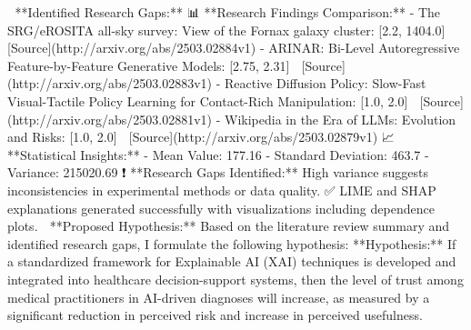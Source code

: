 \documentclass{article}%
\begin{document}
  \newline%
\newline%
🔹 **Identified Research Gaps:**  \newline%
📊 **Research Findings Comparison:**\newline%
{-} The SRG/eROSITA all{-}sky survey: View of the Fornax galaxy cluster: {[}2.2, 1404.0{]} 🔗 {[}Source{]}(http://arxiv.org/abs/2503.02884v1)\newline%
{-} ARINAR: Bi{-}Level Autoregressive Feature{-}by{-}Feature Generative Models: {[}2.75, 2.31{]} 🔗 {[}Source{]}(http://arxiv.org/abs/2503.02883v1)\newline%
{-} Reactive Diffusion Policy: Slow{-}Fast Visual{-}Tactile Policy Learning for\newline%
  Contact{-}Rich Manipulation: {[}1.0, 2.0{]} 🔗 {[}Source{]}(http://arxiv.org/abs/2503.02881v1)\newline%
{-} Wikipedia in the Era of LLMs: Evolution and Risks: {[}1.0, 2.0{]} 🔗 {[}Source{]}(http://arxiv.org/abs/2503.02879v1)\newline%
\newline%
📈 **Statistical Insights:**\newline%
{-} Mean Value: 177.16\newline%
{-} Standard Deviation: 463.7\newline%
{-} Variance: 215020.69\newline%
\newline%
❗ **Research Gaps Identified:** High variance suggests inconsistencies in experimental methods or data quality.\newline%
✅ LIME and SHAP explanations generated successfully with visualizations including dependence plots.  \newline%
\newline%
🔹 **Proposed Hypothesis:**  \newline%
Based on the literature review summary and identified research gaps, I formulate the following hypothesis:\newline%
\newline%
**Hypothesis:**\newline%
\newline%
If a standardized framework for Explainable AI (XAI) techniques is developed and integrated into healthcare decision{-}support systems, then the level of trust among medical practitioners in AI{-}driven diagnoses will increase, as measured by a significant reduction in perceived risk and increase in perceived usefulness.\newline%
\end{document}
